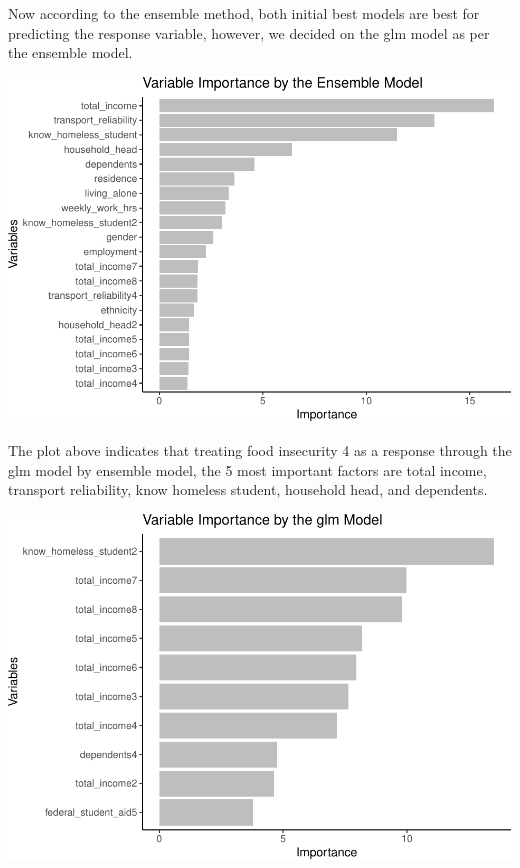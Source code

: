 \documentclass[
  10pt,
]{article}
\begin{document}
Now according to the ensemble method, both initial best models are best for predicting the response variable, however, we decided on the glm model as per the ensemble model.\\

\begin{center}\includegraphics{final_phase2_report_files/figure-latex/unnamed-chunk-31-1} \end{center}

The plot above indicates that treating food insecurity 4 as a response through the glm model by ensemble model, the 5 most important factors are total income, transport reliability, know homeless student, household head, and dependents.\\

\begin{center}\includegraphics{final_phase2_report_files/figure-latex/unnamed-chunk-32-1} \end{center}
\end{document}
